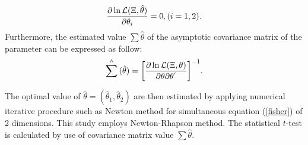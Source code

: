 \begin{eqnarray}
\frac{{\partial \ln {\cal L} (\Xi ,\hat \theta )}}{{\partial \theta _i }} = 0,{\rm{      }}(i = 1,2) .
\end{eqnarray}
Furthermore, the estimated value $\sum {\hat \theta }$ of the asymptotic covariance matrix of the parameter can be expressed as follow:
\begin{eqnarray}
\sum\limits_{}^ \wedge  {(\hat \theta ) = \left[ {\frac{{\partial \ln {\cal L} (\Xi ,\theta )}}{{\partial \theta \partial \theta^{'} }}} \right]} ^{ - 1} . \label{fisher}
\end{eqnarray}
The optimal value of $\hat\theta =(\hat \theta _1 ,\hat\theta _2)$ are then estimated by applying numerical iterative procedure such as Newton method for simultaneous equation (\ref{fisher}) of 2 dimensions. This study employs Newton-Rhapson method. The statistical $t$-test is calculated by use of covariance matrix value $\sum {\hat \theta }$.
